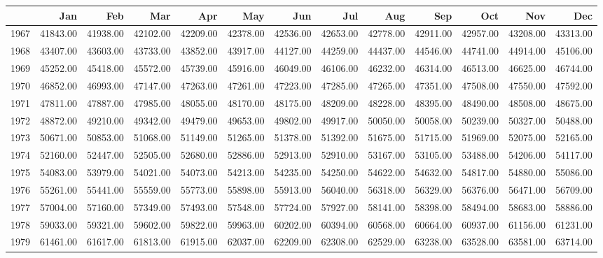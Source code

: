 \begin{longtable}{rrrrrrrrrrrrr}
  \hline
 & Jan & Feb & Mar & Apr & May & Jun & Jul & Aug & Sep & Oct & Nov & Dec \\ 
  \hline
1967 & 41843.00 & 41938.00 & 42102.00 & 42209.00 & 42378.00 & 42536.00 & 42653.00 & 42778.00 & 42911.00 & 42957.00 & 43208.00 & 43313.00 \\ 
  1968 & 43407.00 & 43603.00 & 43733.00 & 43852.00 & 43917.00 & 44127.00 & 44259.00 & 44437.00 & 44546.00 & 44741.00 & 44914.00 & 45106.00 \\ 
  1969 & 45252.00 & 45418.00 & 45572.00 & 45739.00 & 45916.00 & 46049.00 & 46106.00 & 46232.00 & 46314.00 & 46513.00 & 46625.00 & 46744.00 \\ 
  1970 & 46852.00 & 46993.00 & 47147.00 & 47263.00 & 47261.00 & 47223.00 & 47285.00 & 47265.00 & 47351.00 & 47508.00 & 47550.00 & 47592.00 \\ 
  1971 & 47811.00 & 47887.00 & 47985.00 & 48055.00 & 48170.00 & 48175.00 & 48209.00 & 48228.00 & 48395.00 & 48490.00 & 48508.00 & 48675.00 \\ 
  1972 & 48872.00 & 49210.00 & 49342.00 & 49479.00 & 49653.00 & 49802.00 & 49917.00 & 50050.00 & 50058.00 & 50239.00 & 50327.00 & 50488.00 \\ 
  1973 & 50671.00 & 50853.00 & 51068.00 & 51149.00 & 51265.00 & 51378.00 & 51392.00 & 51675.00 & 51715.00 & 51969.00 & 52075.00 & 52165.00 \\ 
  1974 & 52160.00 & 52447.00 & 52505.00 & 52680.00 & 52886.00 & 52913.00 & 52910.00 & 53167.00 & 53105.00 & 53488.00 & 54206.00 & 54117.00 \\ 
  1975 & 54083.00 & 53979.00 & 54021.00 & 54073.00 & 54213.00 & 54235.00 & 54250.00 & 54622.00 & 54632.00 & 54817.00 & 54880.00 & 55086.00 \\ 
  1976 & 55261.00 & 55441.00 & 55559.00 & 55773.00 & 55898.00 & 55913.00 & 56040.00 & 56318.00 & 56329.00 & 56376.00 & 56471.00 & 56709.00 \\ 
  1977 & 57004.00 & 57160.00 & 57349.00 & 57493.00 & 57548.00 & 57724.00 & 57927.00 & 58141.00 & 58398.00 & 58494.00 & 58683.00 & 58886.00 \\ 
  1978 & 59033.00 & 59321.00 & 59602.00 & 59822.00 & 59963.00 & 60202.00 & 60394.00 & 60568.00 & 60664.00 & 60937.00 & 61156.00 & 61231.00 \\ 
  1979 & 61461.00 & 61617.00 & 61813.00 & 61915.00 & 62037.00 & 62209.00 & 62308.00 & 62529.00 & 63238.00 & 63528.00 & 63581.00 & 63714.00 \\ 

\end{longtable}

